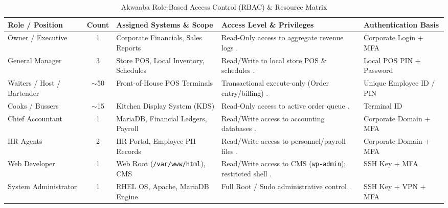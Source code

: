 \documentclass[10pt,a4paper]{article}
\begin{document}
\begin{table}[H]
\centering
\scriptsize
\caption{Akwaaba Role-Based Access Control (RBAC) \& Resource Matrix}
\begin{tabularx}{\textwidth}{l c X X X}
\toprule
\textbf{Role / Position} & \textbf{Count} & \textbf{Assigned Systems \& Scope} & \textbf{Access Level \& Privileges} & \textbf{Authentication Basis} \\
\midrule
Owner / Executive & 1 & Corporate Financials, Sales Reports & Read-Only access to aggregate revenue logs \cite{AkwaabaConfig}. & Corporate Login + MFA \cite{Phase1Guide} \\
General Manager & 3 & Store POS, Local Inventory, Schedules & Read/Write to local store POS \& schedules \cite{AkwaabaConfig}. & Local POS PIN + Password \cite{Phase1Guide} \\
Waiters / Host / Bartender & $\sim$50 & Front-of-House POS Terminals & Transactional execute-only (Order entry/billing) \cite{AkwaabaConfig}. & Unique Employee ID / PIN \cite{Phase1Guide} \\
Cooks / Bussers & $\sim$15 & Kitchen Display System (KDS) & Read-Only access to active order queue \cite{AkwaabaConfig}. & Terminal ID \cite{Phase1Guide} \\
Chief Accountant & 1 & MariaDB, Financial Ledgers, Payroll & Read/Write access to accounting databases \cite{AkwaabaConfig}. & Corporate Domain + MFA \cite{Phase1Guide} \\
HR Agents & 2 & HR Portal, Employee PII Records & Read/Write access to personnel/payroll files \cite{AkwaabaConfig}. & Corporate Domain + MFA \cite{Phase1Guide} \\
Web Developer & 1 & Web Root (\texttt{/var/www/html}), CMS & Read/Write access to CMS (\texttt{wp-admin}); restricted shell \cite{AkwaabaConfig}. & SSH Key + MFA \cite{VMConnect, Phase1Guide} \\
System Administrator & 1 & RHEL OS, Apache, MariaDB Engine & Full Root / Sudo administrative control \cite{AkwaabaConfig}. & SSH Key + VPN + MFA \cite{VMConnect, Phase1Guide} \\
\bottomrule
\end{tabularx}
\end{table}
\end{document}
